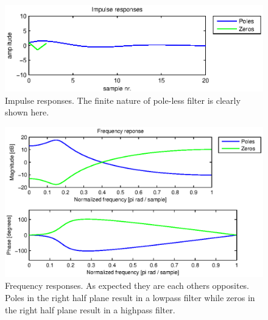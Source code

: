 \begin{figure}
	\center
	\includegraphics{./picture/ha6_1_5_impz.eps}
	\caption{Impulse responses. The finite nature of pole-less filter is clearly shown here.}
	\label{fig:1.5.impz}
\end{figure}

\begin{figure}
	\center
	\includegraphics{./picture/ha6_1_5_freqz.eps}
	\caption{Frequency responses. As expected they are each others opposites. Poles in the right half plane result in a lowpass filter while zeros in the right half plane result in a highpass filter.}
	\label{fig:1.5.freqz}
\end{figure}

